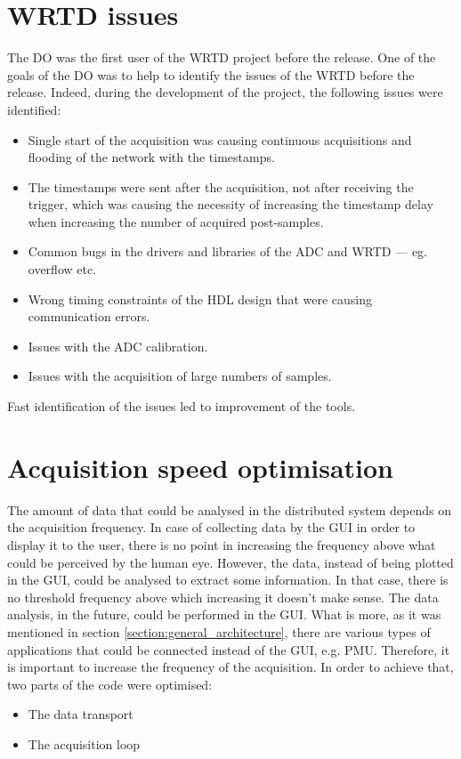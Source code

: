 \section{WRTD issues} \label{section:wrtd_issues}
The DO was the first user of the WRTD project before the release. One of the goals of the DO was to help to identify the issues of the WRTD before the release. Indeed, during the development of the project, the following issues were identified:
\begin{itemize}
    \item Single start of the acquisition was causing continuous acquisitions and flooding of the network with the timestamps.
    \item The timestamps were sent after the acquisition, not after receiving the trigger, which was causing the necessity of increasing the timestamp delay when increasing the number of acquired post-samples.
    \item Common bugs in the drivers and libraries of the ADC and WRTD --- eg. overflow etc.
    \item Wrong timing constraints of the HDL design that were causing communication errors.
    \item Issues with the ADC calibration.
    \item Issues with the acquisition of large numbers of samples.
\end{itemize}

Fast identification of the issues led to improvement of the tools.

    
\section{Acquisition speed optimisation} \label{section:acquisition_speed_optimisation}
    The amount of data that could be analysed in the distributed system depends on the acquisition frequency.
    In case of collecting data by the GUI in order to display it to the user, there is no point in increasing the frequency above what could be perceived by the human eye. 
    However, the data, instead of being plotted in the GUI, could be analysed to extract some information. In that case, there is no threshold frequency above which increasing it doesn't make sense. The data analysis, in the future, could be performed in the GUI. What is more, as it was mentioned in section \ref{section:general_architecture}, there are various types of applications that could be connected instead of the GUI, e.g. PMU. Therefore, it is important to increase the frequency of the acquisition. In order to achieve that, two parts of the code were optimised:
    \begin{itemize}
        \item The data transport
        \item The acquisition loop
    \end{itemize}
    

